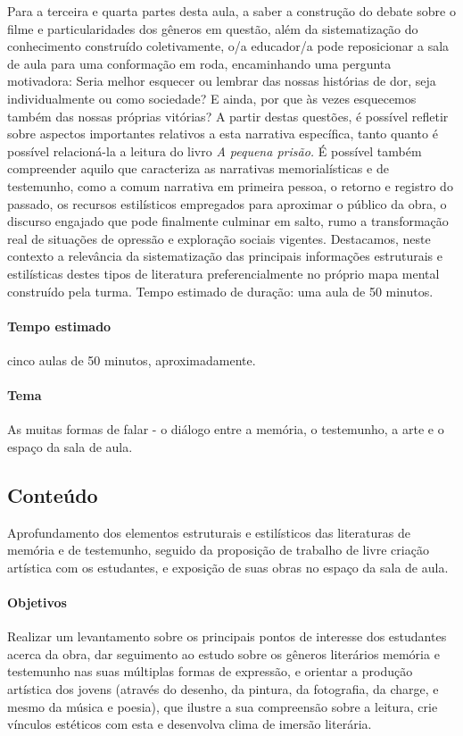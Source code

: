 \documentclass[11pt]{extarticle}
\begin{document}
Para a terceira e quarta partes desta aula, a saber a construção do
debate sobre o filme e particularidades dos gêneros em questão, além da
sistematização do conhecimento construído coletivamente, o/a educador/a
pode reposicionar a sala de aula para uma conformação em roda,
encaminhando uma pergunta motivadora: Seria melhor esquecer ou lembrar
das nossas histórias de dor, seja individualmente ou como sociedade? E
ainda, por que às vezes esquecemos também das nossas próprias vitórias?
A partir destas questões, é possível refletir sobre aspectos importantes
relativos a esta narrativa específica, tanto quanto é possível
relacioná-la a leitura do livro \emph{A pequena prisão.} É possível
também compreender aquilo que caracteriza as narrativas memorialísticas
e de testemunho, como a comum narrativa em primeira pessoa, o retorno e
registro do passado, os recursos estilísticos empregados para aproximar
o público da obra, o discurso engajado que pode finalmente culminar em
salto, rumo a transformação real de situações de opressão e exploração
sociais vigentes. Destacamos, neste contexto a relevância da
sistematização das principais informações estruturais e estilísticas
destes tipos de literatura preferencialmente no próprio mapa mental
construído pela turma. Tempo estimado de duração: uma aula de 50
minutos.

\paragraph{Tempo estimado} cinco aulas de 50 minutos,
aproximadamente.

\paragraph{Tema} As muitas formas de falar - o diálogo entre a memória,
o testemunho, a arte e o espaço da sala de aula.

\subsection{Conteúdo} Aprofundamento dos elementos estruturais e
estilísticos das literaturas de memória e de testemunho, seguido da
proposição de trabalho de livre criação artística com os estudantes, e
exposição de suas obras no espaço da sala de aula.

\paragraph{Objetivos} Realizar um levantamento sobre os principais pontos
de interesse dos estudantes acerca da obra, dar seguimento ao estudo
sobre os gêneros literários memória e testemunho nas suas múltiplas
formas de expressão, e orientar a produção artística dos jovens (através
do desenho, da pintura, da fotografia, da charge, e mesmo da música e
poesia), que ilustre a sua compreensão sobre a leitura, crie vínculos
estéticos com esta e desenvolva clima de imersão literária.
\end{document}

